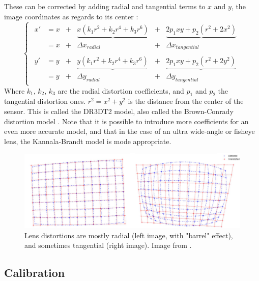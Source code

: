 These can be corrected by adding radial and tangential terms to $x$ and $y$, the image coordinates as regards to its center \cite{Weng1992}:
\begin{equation}
  \begin{cases}
  \begin{array}{rlcccc}
    x' &= x &+ &\underbrace{x(k_1 r^2 + k_2 r^4 + k_3 r^6)} &+ &\underbrace{2 p_1 x y + p_2(r^2 + 2 x^2)}\\
    &= x &+ &\Delta x_{radial} &+ &\Delta x_{tangential}\\
    \\
    y' &= y &+ &\underbrace{y(k_1 r^2 + k_2 r^4 + k_3 r^6)} &+ &\underbrace{2 p_1 x y + p_2(r^2 + 2 y^2)}\\
    &= y &+ &\Delta y_{radial} &+ &\Delta y_{tangential}
    \end{array}
  \end{cases}
\end{equation}
Where $k_1$, $k_2$, $k_3$ are the radial distortion coefficients, and $p_1$ and $p_2$ the tangential distortion ones. $r^2 = x^2 + y^2$ is the distance from the center of the sensor. This is called the DR3DT2 model, also called the Brown-Conrady distortion model \cite{Conrady1919,Brown1966}. Note that it is possible to introduce more coefficients for an even more accurate model, and that in the case of an ultra wide-angle or fisheye lens, the Kannala-Brandt model \cite{Kannala2006} is mode appropriate.

\begin{figure}[hbtp]
	\centering
	\def\svgwidth{\columnwidth}
	\fontsize{10pt}{10pt}\selectfont
	\includegraphics[width=\linewidth]{"../Chap2/Figures/Distortions.png"}
	\caption{Lens distortions are mostly radial (left image, with "barrel" effect), and sometimes tangential (right image). Image from \cite{Ricolfe2010}.} 
	\label{fig_distortions}
\end{figure}


\FloatBarrier
\subsection{Calibration}

